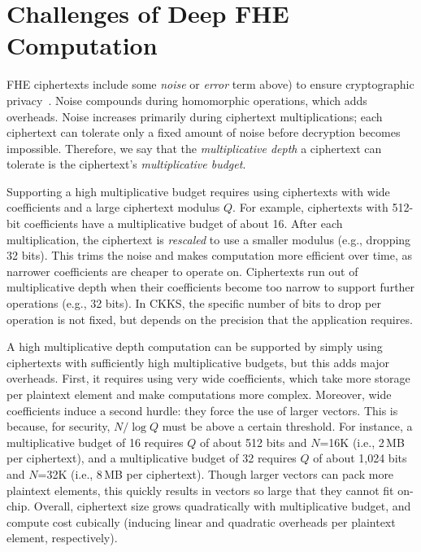 \section{Challenges of Deep FHE Computation}\label{sec:deepChallenges}

FHE ciphertexts include some \emph{noise} or \emph{error} term above) to ensure
cryptographic privacy~\cite{lyubashevsky:tact10:ideal}. Noise compounds during
homomorphic operations, which adds overheads. Noise increases primarily during
ciphertext multiplications; each ciphertext can tolerate only a fixed amount of
noise before decryption becomes impossible. Therefore, we say that the
\emph{multiplicative depth} a ciphertext can tolerate is the ciphertext's
\emph{multiplicative budget}.

Supporting a high multiplicative budget requires using ciphertexts with wide
coefficients and a large ciphertext modulus $Q$. For example, ciphertexts with
512-bit coefficients have a multiplicative budget of about 16. After each
multiplication, the ciphertext is \emph{rescaled} to use a smaller modulus
(e.g., dropping 32 bits). This trims the noise and makes computation more
efficient over time, as narrower coefficients are cheaper to operate on.
Ciphertexts run out of multiplicative depth when their coefficients become too
narrow to support further operations (e.g., 32 bits). In CKKS, the specific
number of bits to drop per operation is not fixed, but depends on the precision
that the application requires.

A high multiplicative depth computation can be supported by simply using
ciphertexts with sufficiently high multiplicative budgets, but this adds major
overheads. First, it requires using very wide coefficients, which take more
storage per plaintext element and make computations more complex. Moreover,
wide coefficients induce a second hurdle: they force the use of larger vectors.
This is because, for security, $N/\log Q$ must be above a certain threshold.
For instance, a multiplicative budget of 16 requires $Q$ of about 512 bits and
$N$=16K (i.e., 2\,MB per ciphertext), and a multiplicative budget of 32
requires $Q$ of about 1,024 bits and $N$=32K (i.e., 8\,MB per ciphertext).
Though larger vectors can pack more plaintext elements, this quickly results in
vectors so large that they cannot fit on-chip. Overall, ciphertext size grows
quadratically with multiplicative budget, and compute cost cubically (inducing
linear and quadratic overheads per plaintext element, respectively).

\figBootstrapping

